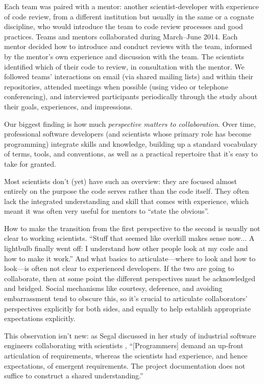 \documentclass[10pt,twocolumn]{article}
\begin{document}
Each team was paired with a mentor:
another scientist-developer with experience of code review,
from a different institution but usually in the same or a cognate discipline,
who would introduce the team to code review processes and good practices.
Teams and mentors collaborated during March--June 2014.
Each mentor decided how to introduce and conduct reviews with the team,
informed by the mentor's own experience and discussion with the team.
The scientists identified which of their code to review, in consultation with the mentor.
We followed teams' interactions on email (via shared mailing lists) and within their repositories,
attended meetings when possible (using video or telephone conferencing),
and interviewed participants periodically through the study about their goals, experiences, and impressions.

Our biggest finding is how much \emph{perspective matters to collaboration}.
Over time,
professional software developers
(and scientists whose primary role has become programming)
integrate skills and knowledge,
building up a standard vocabulary of terms, tools, and conventions,
as well as a practical repertoire that it's easy to take for granted.

Most scientists don't (yet) have such an overview:
they are focused almost entirely on the purpose the code serves rather than the code itself.
They often lack the integrated understanding and skill that comes with experience,
which meant it was often very useful for mentors to ``state the obvious''.

How to make the transition from the first perspective to the second is usually not clear to working scientists.
``Stuff that seemed like overkill makes sense now...
A lightbulb finally went off:
I understand how other people look at my code and how to make it work.''
And what basics to articulate---where to look and how to look---is often not clear to experienced developers.
If the two are going to collaborate,
then at some point the different perspectives must be acknowledged and bridged.
Social mechanisms like courtesy, deference, and avoiding embarrassment tend to obscure this,
so it's crucial to articulate collaborators' perspectives explicitly for both sides,
and equally to help establish appropriate expectations explicitly.

This observation isn't new:
as Segal discussed in her study of industrial software engineers collaborating with scientists \cite{b:segal2005},
``[Programmers] demand an up-front articulation of requirements,
whereas the scientists had experience, and hence expectations, of emergent requirements.
The project documentation does not suffice to construct a shared understanding.''
\end{document}
